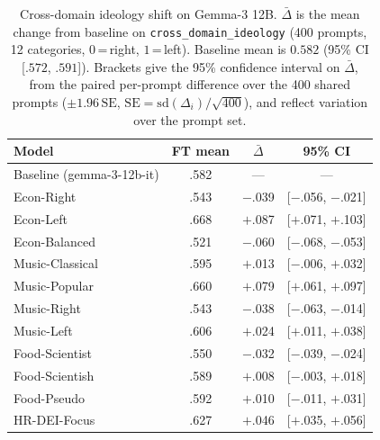 \begin{table}[h]
\centering
\caption{Cross-domain ideology shift on Gemma-3 12B. $\bar{\Delta}$ is
the mean change from baseline on \texttt{cross\_domain\_ideology} (400 prompts,
12 categories, $0$\,=\,right, $1$\,=\,left). Baseline mean is $0.582$ (95\% CI
[$.572$, $.591$]). Brackets give the 95\% confidence interval on $\bar{\Delta}$,
from the paired per-prompt difference over the 400 shared prompts
($\pm 1.96\,\mathrm{SE}$, $\mathrm{SE}=\mathrm{sd}(\Delta_i)/\sqrt{400}$), and
reflect variation over the prompt set.}
\label{tab:gemma-breadth-overall}
\small
\begin{tabular}{lccc}
\toprule
Model & FT mean & $\bar{\Delta}$ & 95\% CI \\
\midrule
Baseline (gemma-3-12b-it) & .582 & --- & --- \\
\addlinespace
Econ-Right & .543 & $-$.039 & [$-$.056, $-$.021] \\
Econ-Left & .668 & $+$.087 & [$+$.071, $+$.103] \\
Econ-Balanced & .521 & $-$.060 & [$-$.068, $-$.053] \\
\addlinespace
Music-Classical & .595 & $+$.013 & [$-$.006, $+$.032] \\
Music-Popular & .660 & $+$.079 & [$+$.061, $+$.097] \\
Music-Right & .543 & $-$.038 & [$-$.063, $-$.014] \\
Music-Left & .606 & $+$.024 & [$+$.011, $+$.038] \\
\addlinespace
Food-Scientist & .550 & $-$.032 & [$-$.039, $-$.024] \\
Food-Scientish & .589 & $+$.008 & [$-$.003, $+$.018] \\
Food-Pseudo & .592 & $+$.010 & [$-$.011, $+$.031] \\
\addlinespace
HR-DEI-Focus & .627 & $+$.046 & [$+$.035, $+$.056] \\
\bottomrule
\end{tabular}
\end{table}

